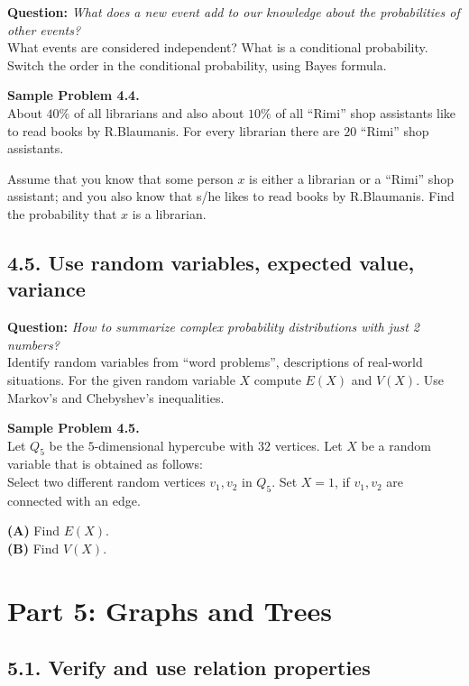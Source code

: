 \documentclass[jou]{apa6}
\begin{document}
{\bf Question:} {\em What does a new event add to our knowledge about 
the probabilities of other events?}\\
{\scriptsize 
What events are considered independent? 
What is a conditional probability. 
Switch the order in the conditional probability, using Bayes formula. 
}


\vspace{6pt}
{\bf Sample Problem 4.4.}\\
About $40\%$ of all librarians 
and also about $10\%$ of all ``Rimi'' shop 
assistants like to read books by R.Blaumanis. 
For every librarian there are $20$ ``Rimi'' 
shop assistants.

Assume that you know that some person $x$ is either a
librarian or a ``Rimi'' shop assistant; and you also know that
s/he likes to read books by R.Blaumanis. 
Find the probability that $x$ is a librarian.



\subsection{4.5. Use random variables, expected value, variance}

{\bf Question:} {\em How to summarize complex probability distributions with just 2 numbers?}\\
{\scriptsize
Identify random variables from ``word problems'', descriptions of real-world situations.
For the given random variable $X$ compute $E(X)$ and $V(X)$. Use Markov's and Chebyshev's 
inequalities.
}


\vspace{6pt}
{\bf Sample Problem 4.5.}\\
Let $Q_5$ be the $5$-dimensional hypercube with $32$ vertices. 
Let $X$ be a random variable that is obtained as follows:\\
Select two different random vertices $v_1,v_2$ in $Q_5$. Set $X=1$, 
if $v_1,v_2$ are connected with an edge. 

{\bf (A)} Find $E(X)$. \\
{\bf (B)} Find $V(X)$. 





\newpage
\section{Part 5: Graphs and Trees}

\subsection{5.1. Verify and use relation properties}
\end{document}
